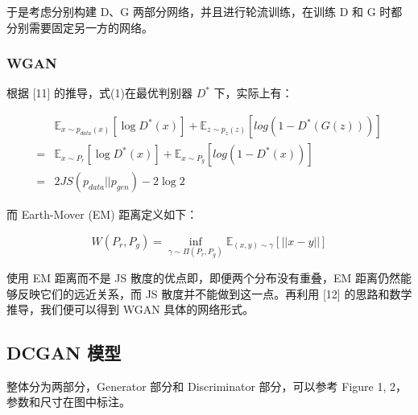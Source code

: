 \documentclass{article}
\begin{document}
\begin{CJK*}{UTF8}{gbsn}
	 于是考虑分别构建 D、G 两部分网络，并且进行轮流训练，在训练 D 和 G 时都分别需要固定另一方的网络。
    
    \subsubsection{WGAN}
   
    根据 [11] 的推导，式(1)在最优判别器 $D^*$ 下，实际上有：
    
    \begin{equation}
    \begin{aligned}
	  &\mathbb{E}_{x\sim p_{data}(x)}[\log D^*(x)] + \mathbb{E}_{z\sim p_z(z)}[log(1-D^*(G(z)))] \\
	  = &\mathbb{E}_{x\sim P_r}[\log D^*(x)] + \mathbb{E}_{x\sim P_g}[log(1-D^*(x))] \\
	  = &2JS(p_{data} || p_{gen}) - 2\log 2
	\end{aligned}
    \end{equation}

	而 Earth-Mover (EM) 距离定义如下：
	
	\begin{equation}
	  W(P_r, P_g) = \inf_{\gamma \sim \Pi(P_r, P_g)} \mathbb{E}_{(x, y) \sim \gamma}[||x-y||]
	\end{equation}
	
	使用 EM 距离而不是 JS 散度的优点即，即便两个分布没有重叠，EM 距离仍然能够反映它们的远近关系，而 JS 散度并不能做到这一点。再利用 [12] 的思路和数学推导，我们便可以得到 WGAN 具体的网络形式。
	
  \subsection{DCGAN 模型}
  
	整体分为两部分，Generator 部分和 Discriminator 部分，可以参考 Figure 1, 2，参数和尺寸在图中标注。
	

\end{CJK*}
\end{document}
